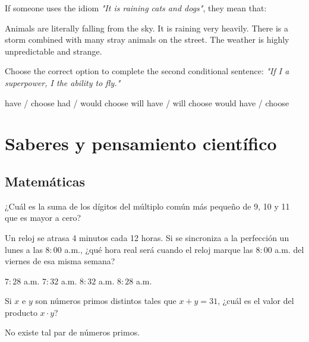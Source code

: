 \documentclass[12pt]{evaluasep}
\begin{document}
\begin{questions}
    \question If someone uses the idiom \textit{"It is raining cats and dogs"}, they mean that:
    \begin{choices}
        \choice Animals are literally falling from the sky.
        \CorrectChoice It is raining very heavily.
        \choice There is a storm combined with many stray animals on the street.
        \choice The weather is highly unpredictable and strange.
    \end{choices}
   

    \question Choose the correct option to complete the second conditional sentence: \textit{"If I \underline{\hspace{2cm}} a superpower, I \underline{\hspace{2cm}} the ability to fly."}
    \begin{choices}
        \choice have / choose
        \CorrectChoice had / would choose
        \choice will have / will choose
        \choice would have / choose
    \end{choices}

\newpage

\section{Saberes y pensamiento científico}
\subsection{Matemáticas}

\question ¿Cuál es la suma de los dígitos del múltiplo común más pequeño de 9, 10 y 11 que es mayor a cero?
    \begin{choices}
    \end{choices}


    \question Un reloj se atrasa 4 minutos cada 12 horas. Si se sincroniza a la perfección un lunes a las $8:00$ a.m., ¿qué hora real será cuando el reloj marque las $8:00$ a.m. del viernes de esa misma semana?
    
	\begin{choices}
        \choice $7:28$ a.m.
        \choice $7:32$ a.m.
        \CorrectChoice $8:32$ a.m.
        \choice $8:28$ a.m.
    \end{choices}
	

    \question Si $x$ e $y$ son números primos distintos tales que $x + y = 31$, ¿cuál es el valor del producto $x \cdot y$?
    \begin{choices}
        \choice No existe tal par de números primos.
    \end{choices}
	


\end{questions}
\end{document}
